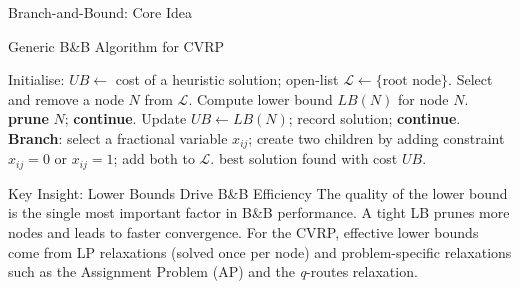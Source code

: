 \documentclass[aspectratio=169,10pt]{beamer}
\begin{document}
\begin{frame}[allowframebreaks]{Branch-and-Bound: Core Idea}
  \framebreak

  \begin{block}{Generic B\&B Algorithm for CVRP}
    \begin{algorithmic}[1]
      \State Initialise: $UB \leftarrow$ cost of a heuristic solution;
             open-list $\mathcal{L} \leftarrow \{\text{root node}\}$.
        \State Select and remove a node $N$ from $\mathcal{L}$.
        \State Compute lower bound $LB(N)$ for node $N$.
         \textbf{prune} $N$; \textbf{continue}.
        \EndIf
          \State Update $UB \leftarrow LB(N)$; record solution; \textbf{continue}.
        \EndIf
        \State \textbf{Branch}: select a fractional variable $x_{ij}$; create
               two children by adding constraint $x_{ij}=0$ or $x_{ij}=1$;
               add both to $\mathcal{L}$.
      \EndWhile
      \State \Return best solution found with cost $UB$.
    \end{algorithmic}
  \end{block}

  \framebreak

  \begin{alertblock}{Key Insight: Lower Bounds Drive B\&B Efficiency}
    The quality of the lower bound is the single most important factor
    in B\&B performance. A tight LB prunes more nodes and leads to faster
    convergence. For the CVRP, effective lower bounds come from LP relaxations
    (solved once per node) and problem-specific relaxations such as the
    Assignment Problem (AP) and the \emph{q}-routes relaxation.
  \end{alertblock}
\end{frame}
\end{document}
